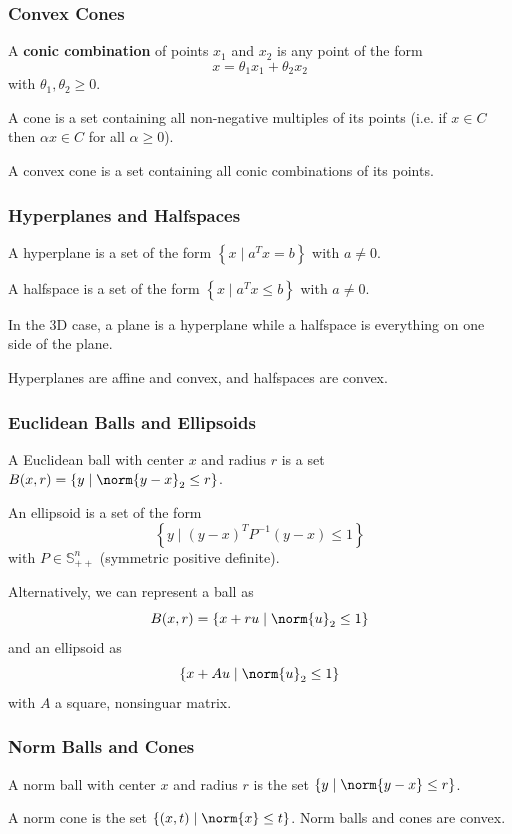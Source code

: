 \documentclass[11pt]{article}
\begin{document}
\subsubsection*{Convex Cones} 
A \textbf{conic combination} of points $x_1$ and $x_2$ is any point of the form 
\[ x = \theta_1 x_1 + \theta_2 x_2 \] 
with $\theta_1, \theta_2 \geq 0$. \par 
A cone is a set containing all non-negative multiples of its points (i.e. if $x \in C$ then $\alpha x \in C$ for all $\alpha \geq 0$). \par
A convex cone is a set containing all conic combinations of its points. 

\subsubsection*{Hyperplanes and Halfspaces} 
A hyperplane is a set of the form $\left\{ x \mid a^Tx = b \right\}$ with $a \neq 0$. \par
A halfspace is a set of the form $\left\{ x \mid a^Tx \leq b \right\}$ with $a \neq 0$. \par
In the 3D case, a plane is a hyperplane while a halfspace is everything on one side of the plane. \par 
Hyperplanes are affine and convex, and halfspaces are convex.

\subsubsection*{Euclidean Balls and Ellipsoids} 
A Euclidean ball with center $x$ and radius $r$ is a set $B(x, r) = \left\{ y \mid \norm{y - x}_2 \leq r \right\}$. \par
An ellipsoid is a set of the form 
\[ \left\{ y \mid (y - x)^T P^{-1} (y - x) \leq 1 \right\} \] 
with $P \in \mathbb{S}_{++}^n$ (symmetric positive definite). \par 
Alternatively, we can represent a ball as 
\[ B(x, r) = \left\{ x + ru \mid \norm{u}_2 \leq 1 \right\} \] 
and an ellipsoid as 
\[ \left\{ x + Au \mid \norm{u}_2 \leq 1 \right\} \] 
with $A$ a square, nonsinguar matrix. 

\subsubsection*{Norm Balls and Cones} 
A norm ball with center $x$ and radius $r$ is the set $\left\{ y \mid \norm{y - x} \leq r \right\}$. \par 
A norm cone is the set $\left\{ (x, t) \mid \norm{x} \leq t \right\}$. 
Norm balls and cones are convex.
\end{document}
